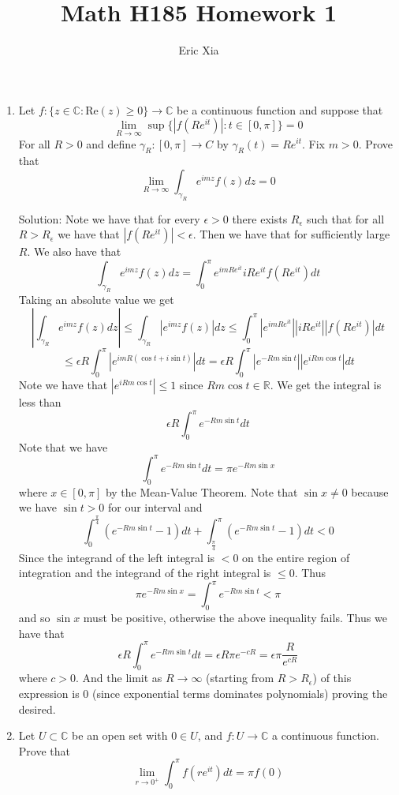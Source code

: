 \documentclass[11pt]{article}
\title{Math H185 Homework 1}
\author{Eric Xia}
\newcommand{\re}[0]{\text{Re}}
\newcommand{\C}{\mathbb{C}}
\newcommand{\R}{\mathbb{R}}
\begin{document}
\maketitle

\begin{enumerate}[(1)]

\item Let $f: \{z \in \C : \re(z) \geq 0 \} \to \C$ be a continuous function and suppose that 
$$ \lim_{R \to \infty} \sup\{|f(Re^{it})|:t \in [0, \pi]\} = 0 $$
For all $R > 0$ and define $\gamma_R:[0, \pi] \to C$ by $\gamma_R(t) = Re^{it}$. Fix $m > 0$. Prove that 
$$ \lim_{R \to \infty}\int_{\gamma_R}e^{imz} f(z)dz = 0 $$

Solution: Note we have that for every $\epsilon > 0$ there exists $R_{\epsilon}$ such that for all $R > R_{\epsilon}$ we have that $|f(Re^{it})| < \epsilon$. Then we have that for sufficiently large $R$. We also have that 
$$ \int_{\gamma_R} e^{imz}f(z)dz = \int_0^{\pi}e^{imRe^{it}}iRe^{it}f(Re^{it})dt $$
Taking an absolute value we get 
$$ |\int_{\gamma_R}e^{imz}f(z)dz| \leq \int_{\gamma_R}|e^{imz}f(z)|dz \leq \int_0^{\pi} |e^{imRe^{it}}||iRe^{it}||f(Re^{it})|dt $$
$$ \leq \epsilon R \int_0^{\pi} |e^{imR(\cos t + i\sin t)}|dt = \epsilon R\int_0^{\pi}|e^{-Rm\sin t}| |e^{iRm\cos t}|dt  $$
Note we have that $|e^{iRm\cos t}| \leq 1$ since $Rm \cos t \in \R$. We get the integral is less than
$$ \epsilon R \int_0^{\pi} e^{-Rm \sin t}dt $$
Note that we have 
$$ \int_0^{\pi}e^{-Rm\sin t}dt = \pi e^{-Rm\sin x} $$
where $x \in [0, \pi]$ by the Mean-Value Theorem. Note that $\sin x \neq 0$ because we have $\sin t > 0$ for our interval and 
$$ \int_{0}^{\frac{\pi}{4}} (e^{-Rm \sin t} - 1)dt + \int_{\frac{\pi}{4}}^{\pi} (e^{-Rm \sin t} - 1)dt < 0$$
Since the integrand of the left integral is $<0$ on the entire region of integration and the integrand of the right integral is $\leq 0$. Thus 
$$ \pi e^{-Rm\sin x} = \int_0^{\pi} e^{-Rm \sin t} < \pi $$
and so $\sin x$ must be positive, otherwise the above inequality fails. Thus we have that 
$$ \epsilon R \int_0^{\pi} e^{-Rm \sin t}dt = \epsilon R \pi e^{-cR} = \epsilon\pi \frac{R}{e^{cR}} $$
where $c > 0$. And the limit as $R \to \infty$ (starting from $R > R_{\epsilon}$) of this expression is $0$ (since exponential terms dominates polynomials) proving the desired.



\item Let $U \subset \C$ be an open set with $0 \in U$, and $f: U \to \C$ a continuous function. Prove that 
$$ \lim_{r \to 0^+}\int_0^{\pi} f(re^{it})dt = \pi f(0) $$


\end{enumerate}
\end{document}
